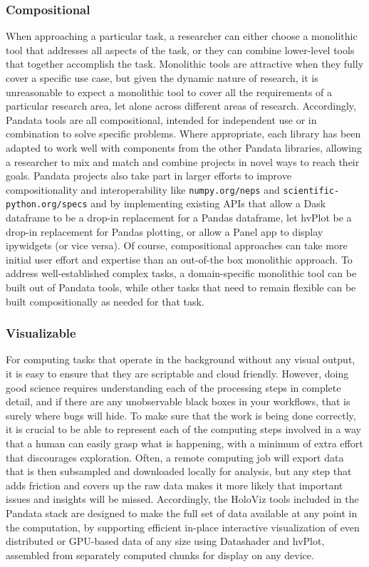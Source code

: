 \subsubsection{Compositional}
When approaching a particular task, a researcher can either choose a monolithic tool that addresses all aspects of the task, or they can combine lower-level tools that together accomplish the task. Monolithic tools are attractive when they fully cover a specific use case, but given the dynamic nature of research, it is unreasonable to expect a monolithic tool to cover all the requirements of a particular research area, let alone across different areas of research. Accordingly, Pandata tools are all compositional, intended for independent use or in combination to solve specific problems. Where appropriate, each library has been adapted to work well with components from the other Pandata libraries, allowing a researcher to mix and match and combine projects in novel ways to reach their goals. Pandata projects also take part in larger efforts to improve compositionality and interoperability like \texttt{numpy.org/neps} and \texttt{scientific-python.org/specs} and by implementing existing APIs that allow a Dask dataframe to be a drop-in replacement for a Pandas dataframe, let hvPlot be a drop-in replacement for Pandas plotting, or allow a Panel app to display ipywidgets (or vice versa). Of course, compositional approaches can take more initial user effort and expertise than an out-of-the box monolithic approach. To address well-established complex tasks, a domain-specific monolithic tool can be built out of Pandata tools, while other tasks that need to remain flexible can be built compositionally as needed for that task.

\subsubsection{Visualizable}
For computing tasks that operate in the background without any visual output, it is easy to ensure that they are scriptable and cloud friendly. However, doing good science requires understanding each of the processing steps in complete detail, and if there are any unobservable black boxes in your workflows, that is surely where bugs will hide. To make sure that the work is being done correctly, it is crucial to be able to represent each of the computing steps involved in a way that a human can easily grasp what is happening, with a minimum of extra effort that discourages exploration. Often, a remote computing job will export data that is then subsampled and downloaded locally for analysis, but any step that adds friction and covers up the raw data makes it more likely that important issues and insights will be missed. Accordingly, the HoloViz tools included in the Pandata stack are designed to make the full set of data available at any point in the computation, by supporting efficient in-place interactive visualization of even distributed or GPU-based data of any size using Datashader and hvPlot, assembled from separately computed chunks for display on any device.

